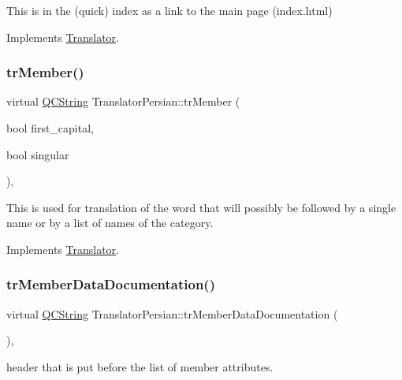 This is in the (quick) index as a link to the main page (index.\+html) 

Implements \mbox{\hyperlink{class_translator}{Translator}}.

\mbox{\label{class_translator_persian_af4f8bb66b2100cc0d3d97cd516919a72}} 
\subsubsection{\texorpdfstring{trMember()}{trMember()}}
{\footnotesize\ttfamily virtual \mbox{\hyperlink{class_q_c_string}{Q\+C\+String}} Translator\+Persian\+::tr\+Member (\begin{DoxyParamCaption}\item[{bool}]{first\+\_\+capital,  }\item[{bool}]{singular }\end{DoxyParamCaption})\hspace{0.3cm}{\ttfamily [inline]}, {\ttfamily [virtual]}}

This is used for translation of the word that will possibly be followed by a single name or by a list of names of the category. 

Implements \mbox{\hyperlink{class_translator}{Translator}}.

\mbox{\label{class_translator_persian_a6814457943d64ada3cf182510632be7b}} 
\subsubsection{\texorpdfstring{trMemberDataDocumentation()}{trMemberDataDocumentation()}}
{\footnotesize\ttfamily virtual \mbox{\hyperlink{class_q_c_string}{Q\+C\+String}} Translator\+Persian\+::tr\+Member\+Data\+Documentation (\begin{DoxyParamCaption}{ }\end{DoxyParamCaption})\hspace{0.3cm}{\ttfamily [inline]}, {\ttfamily [virtual]}}

header that is put before the list of member attributes. 

